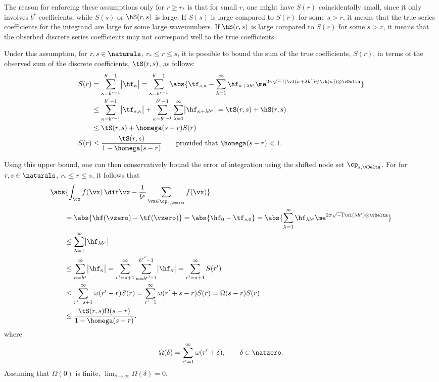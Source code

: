 \documentclass[]{elsarticle}
\begin{document}
The reason for enforcing these assumptions only  for $r \ge r_*$ is that for small $r$, one might have $S(r)$ coincidentally small, since it only involves $b^r$ coefficients, while $S(s)$ or $\hS(r,s)$ is large.  If $S(s)$ is large compared to $S(r)$ for some $s > r$, it means that the true series coefficients for the integrand are large for some large wavenumbers.  If $\hS(r,s)$ is large compared to $S(r)$ for some $s > r$, it means that the obserbed discrete series coefficients may not correspond well to the true coefficients.

Under this assumption, for $r, s \in \naturals$, $r_* \le r \le s$, it is possible to bound the sum of the true coefficients, $S(r)$, in terms of the observed sum of the discrete coefficients, $\tS(r,s)$, as follows:
\begin{align*}
S(r) &= \sum_{\kappa=b^{r-1}}^{b^{r}-1} \bigl \lvert \hf_{\kappa}\bigr\rvert= \sum_{\kappa=b^{r-1}}^{b^{r}-1} \abs{\tf_{s,\kappa} - \sum_{\lambda=1}^{\infty} \hf_{\kappa+\lambda b^{s}} \me^{2 \pi \sqrt{-1} (\vl(\kappa+\lambda b^{s}) \ominus \vk(\kappa)) \otimes \vDelta}}\\
&\le \sum_{\kappa=b^{r-1}}^{b^{r}-1} \bigl \lvert \tf_{s,\kappa} \bigr\rvert + \sum_{\kappa=b^{r-1}}^{b^{r}-1} \sum_{\lambda=1}^{\infty} \bigl \lvert \hf_{\kappa+\lambda b^{s}}\bigr\rvert = \tS(r,s) + \hS(r,s) \\
&\le \tS(r,s) + \homega(s-r) S(r) \\
S(r) & \le \frac{\tS(r,s)}{1 - \homega(s-r)} \qquad \text{provided that } \homega(s-r) < 1.
\end{align*}

Using this upper bound, one can then conservatively bound the error of integration using the shifted node set $\cp_{s,\vDelta}$.  For for $r, s \in \naturals$, $r_* \le r \le s$, it follows that 
\begin{align*}
\MoveEqLeft{\abs{\int_{\cx} f(\vx) \, \dif \vx - \frac{1}{b^s} \sum_{\vx \in \cp_{s,\vDelta}} f(\vx) }}\\
&= \abs{\hf(\vzero) - \tf(\vzero)} = \abs{\hf_0 - \tf_{s,0}} = \abs{\sum_{\lambda=1}^{\infty} \hf_{\lambda b^{s}} \me^{2 \pi \sqrt{-1} \vl(\lambda b^{s}) \otimes \vDelta}}\\
&\le \sum_{\lambda=1}^{\infty} \bigl \lvert \hf_{\lambda b^{s}} \bigr \rvert \\
&\le \sum_{\kappa=b^{s}}^{\infty} \bigl \lvert \hf_{\kappa} \bigr \rvert = \sum_{r'=s+1}^{\infty} \sum_{\kappa=b^{r'-1}}^{b^{r'}-1} \bigl \lvert \hf_{\kappa} \bigr \rvert = \sum_{r'=s+1}^{\infty} S(r')\\
&\le \sum_{r'=s+1}^{\infty} \omega(r'-r) S(r) =   \sum_{r'=1}^{\infty} \omega(r'+s-r) S(r) =  \Omega(s-r) S(r)\\
& \le \frac{\tS(r,s)\Omega(s-r)}{1 - \homega(s-r)}.
\end{align*}
where 
\[
\Omega(\delta)=\sum_{r'=1}^{\infty} \omega(r'+ \delta), \qquad \delta \in \natzero.
\]
Assuming that $\Omega(0)$ is finite, $\lim_{\delta \to \infty} \Omega(\delta) = 0$.
\end{document}
